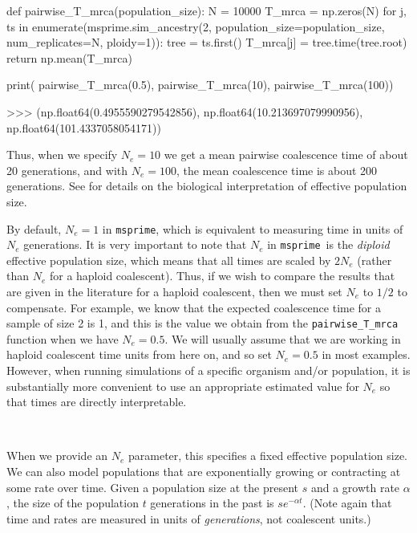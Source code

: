 \documentclass[graybox]{svmult}
\newcommand{\msprime}[0]{\texttt{msprime}}
\begin{document}
\begin{pythoncode}
def pairwise_T_mrca(population_size):
    N = 10000
    T_mrca = np.zeros(N)
    for j, ts in enumerate(msprime.sim_ancestry(2, population_size=population_size, num_replicates=N, ploidy=1)):
        tree = ts.first()
        T_mrca[j] = tree.time(tree.root)
    return np.mean(T_mrca)

print(
    pairwise_T_mrca(0.5), pairwise_T_mrca(10),
    pairwise_T_mrca(100))

>>> (np.float64(0.4955590279542856),
     np.float64(10.213697079990956),
     np.float64(101.4337058054171))

\end{pythoncode}

    Thus, when we specify \(N_e=10\) we get a mean pairwise coalescence time of about
20 generations, and with \(N_e=100\), the mean coalescence time is about
200 generations. See \cite{wakely2008coalescent} for details on the biological interpretation of effective population size.

By default, \(N_e = 1\) in \msprime, which is equivalent to measuring
time in units of \(N_e\) generations. It is very important to note that
\(N_e\) in \msprime\ is the \emph{diploid} effective population size,
which means that all times are scaled by \(2N_e\) (rather than $N_e$ for a
haploid coalescent). Thus, if we wish to compare the results that are
given in the literature for a haploid coalescent, then we must set
\(N_e\) to $1/2$ to compensate. For example, we know that the expected
coalescence time for a sample of size 2 is 1, and this is the value we
obtain from the \texttt{pairwise\_T\_mrca} function when we have
\(N_e=0.5\). We will usually assume that we are working in haploid
coalescent time units from here on, and so set \(N_e=0.5\) in most
examples. However, when running simulations of a specific organism and/or population, it
is substantially more convenient to use an appropriate estimated value
for \(N_e\) so that times are directly interpretable.

\label{exponentially-growingshrinking-populations} \

When we provide an \(N_e\) parameter, this specifies a fixed effective
population size. We can also model populations that are exponentially
growing or contracting at some rate over time. Given a population size
at the present \(s\) and a growth rate \(\alpha\), the size of the
population \(t\) generations in the past is $s e^{-\alpha t}$. (Note
again that time and rates are measured in units of \emph{generations},
not coalescent units.)
\end{document}
